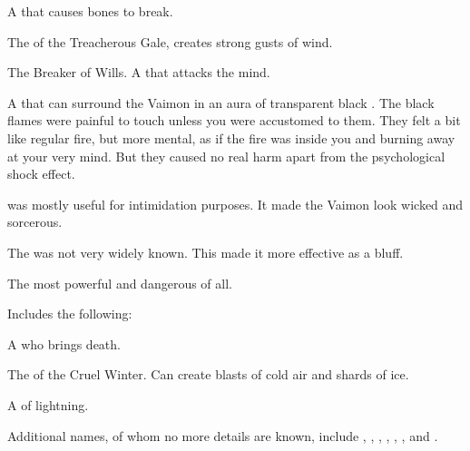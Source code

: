 \begin{subgloss}
  \begin{sephlist}
    \seph{\Djerzad}
    \index{\Djerzad}
    A \Qliphah{} that causes bones to break. 
    
    \seph{\Iphicoss}
    \index{\Iphicoss}
    The \Kliffah{} of the Treacherous Gale, creates strong gusts of wind. 
    
    \seph{\Kithvaz}
    \index{\Kithvaz}
    The Breaker of Wills. 
    A \qliphah{} that attacks the mind. 
    
    \seph{\Shurreem}
    \index{\Shurreem}
    A \qliphah that can surround the Vaimon in an aura of transparent black . 
    The black flames were painful to touch unless you were accustomed to them. 
    They felt a bit like regular fire, but more mental, as if the fire was inside you and burning away at your very mind. 
    But they caused no real harm apart from the psychological shock effect. 
    
    \Shurreem was mostly useful for intimidation purposes. 
    It made the Vaimon look wicked and sorcerous. 
    
    The \qliphah was not very widely known. 
    This made it more effective as a bluff. 
  \end{sephlist}




  \begin{comment}
  \paragraph{Circle of Midnight}
  \end{comment}
  The most powerful and dangerous of all. 
  
  Includes the following: 
  
  \begin{sephlist}
    \seph{\Bozchul}
    \index{\Bozchul}
    A \qliphah{} who brings death. 
    
    \seph{\Horvaleth}
    \index{\Horvaleth}
    The \Kliffah{} of the Cruel Winter. 
    Can create blasts of cold air and shards of ice. 
    
    \seph{\Nyxachel}
    \index{\Nyxachel}
    A \Kliffah{} of lightning. 
  \end{sephlist}




  \begin{comment}
  \paragraph{Others}
  \end{comment}
    Additional names, of whom no more details are known, include \Abbath, \Iachadion, \Iomelech, \Micozalra, \Oronigath, \Ozorugai, \Shabolan and \Zobbath. 
\end{subgloss}





